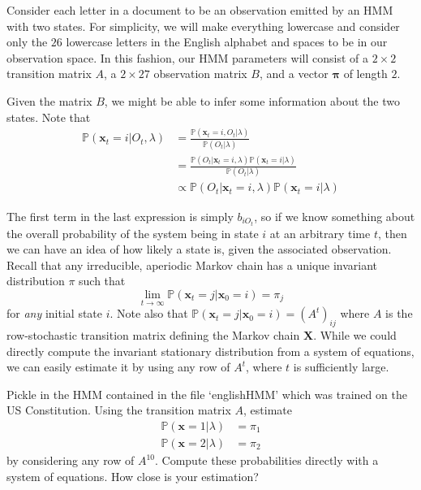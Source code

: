 

Consider each letter in a document to be an observation emitted by an HMM with two states. For simplicity, we will make everything lowercase and consider only the $26$ lowercase letters in the English alphabet and spaces to be in our observation space. In this fashion, our HMM parameters will consist of a $2 \times 2$ transition matrix $A$, a $2 \times 27$ observation matrix $B$, and a vector $\mathbf{\pi}$ of length $2$.

Given the matrix $B$, we might be able to infer some information about the two states. Note that
\begin{align*}
\mathbb{P}(\mathbf{x}_{t} = i | O_{t},\lambda) & = \frac{\mathbb{P}(\mathbf{x}_{t} = i, O_{t} | \lambda)}{\mathbb{P}(O_{t} | \lambda)} \\
& = \frac{\mathbb{P}(O_{t} | \mathbf{x}_{t} = i, \lambda) \mathbb{P}(\mathbf{x}_{t} = i | \lambda)}{\mathbb{P}(O_{t} | \lambda)} \\
& \propto \mathbb{P}(O_{t} | \mathbf{x}_{t} = i, \lambda) \mathbb{P}(\mathbf{x}_{t} = i| \lambda)
\end{align*}

The first term in the last expression is simply $b_{iO_{t}}$, so if we know something about the overall probability of the system being in state $i$ at an arbitrary time $t$, then we can have an idea of how likely a state is, given the associated observation. Recall that any irreducible, aperiodic Markov chain has a unique invariant distribution $\pi$ such that $$\lim_{t \rightarrow \infty} \mathbb{P}(\mathbf{x}_{t} = j | \mathbf{x}_{0} = i) = \pi_{j}$$ for \emph{any} initial state $i$. Note also that $\mathbb{P}(\mathbf{x}_{t} = j | \mathbf{x}_{0} = i) = (A^{t})_{ij}$ where $A$ is the row-stochastic transition matrix defining the Markov chain $\mathbf{X}$. While we could directly compute the invariant stationary distribution from a system of equations, we can easily estimate it by using any row of $A^{t}$, where $t$ is sufficiently large.

\begin{problem}
Pickle in the HMM contained in the file `englishHMM' which was trained on the US Constitution. Using the transition matrix $A$, estimate
\begin{align*}
\mathbb{P}(\mathbf{x} = 1 | \lambda) & = \pi_{1} \\
\mathbb{P}(\mathbf{x} = 2 | \lambda) & = \pi_{2}
\end{align*}
by considering any row of $A^{10}$. Compute these probabilities directly with a system of equations. How close is your estimation?
\end{problem}

